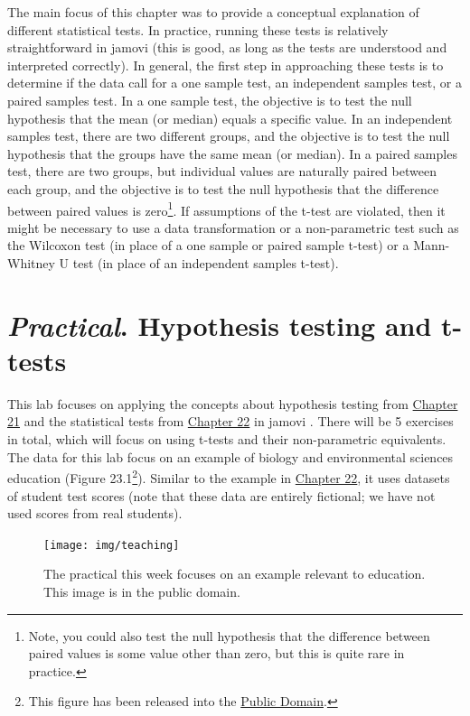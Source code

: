 \documentclass[
]{scrbook}
\begin{document}
The main focus of this chapter was to provide a conceptual explanation of different statistical tests.
In practice, running these tests is relatively straightforward in jamovi (this is good, as long as the tests are understood and interpreted correctly).
In general, the first step in approaching these tests is to determine if the data call for a one sample test, an independent samples test, or a paired samples test.
In a one sample test, the objective is to test the null hypothesis that the mean (or median) equals a specific value.
In an independent samples test, there are two different groups, and the objective is to test the null hypothesis that the groups have the same mean (or median).
In a paired samples test, there are two groups, but individual values are naturally paired between each group, and the objective is to test the null hypothesis that the difference between paired values is zero\footnote{Note, you could also test the null hypothesis that the difference between paired values is some value other than zero, but this is quite rare in practice.}.
If assumptions of the t-test are violated, then it might be necessary to use a data transformation or a non-parametric test such as the Wilcoxon test (in place of a one sample or paired sample t-test) or a Mann-Whitney U test (in place of an independent samples t-test).

\hypertarget{Chapter_23}{%
\chapter{\texorpdfstring{\emph{Practical}. Hypothesis testing and t-tests}{Practical. Hypothesis testing and t-tests}}\label{Chapter_23}}

This lab focuses on applying the concepts about hypothesis testing from \protect\hyperlink{Chapter_21}{Chapter 21} and the statistical tests from \protect\hyperlink{Chapter_22}{Chapter 22} in jamovi \citep{Jamovi2022}.
There will be 5 exercises in total, which will focus on using t-tests and their non-parametric equivalents.
The data for this lab focus on an example of biology and environmental sciences education (Figure 23.1\footnote{This figure has been released into the \href{https://commons.wikimedia.org/wiki/File:Teach_in_pine_needles.jpg}{Public Domain}.}).
Similar to the example in \protect\hyperlink{Chapter_22}{Chapter 22}, it uses datasets of student test scores (note that these data are entirely fictional; we have not used scores from real students).

\begin{figure}
\texttt{[image: img/teaching]} \caption{The practical this week focuses on an example relevant to education. This image is in the public domain.}\label{fig:unnamed-chunk-99}
\end{figure}
\end{document}
